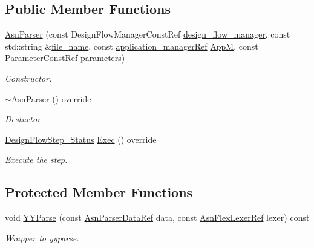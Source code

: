 \subsection*{Public Member Functions}
\begin{DoxyCompactItemize}
\item 
\hyperlink{classAsnParser_a82d6e881bf9cff853a03b9cc83d23532}{Asn\+Parser} (const Design\+Flow\+Manager\+Const\+Ref \hyperlink{classDesignFlowStep_ab770677ddf087613add30024e16a5554}{design\+\_\+flow\+\_\+manager}, const std\+::string \&\hyperlink{classParserFlowStep_a728b0a03e63e3529176b848880d12c72}{file\+\_\+name}, const \hyperlink{application__manager_8hpp_a04ccad4e5ee401e8934306672082c180}{application\+\_\+manager\+Ref} \hyperlink{classAsnParser_a4e0a80b38bb3eca0c3c6641bf6173fff}{AppM}, const \hyperlink{Parameter_8hpp_a37841774a6fcb479b597fdf8955eb4ea}{Parameter\+Const\+Ref} \hyperlink{classDesignFlowStep_a802eaafe8013df706370679d1a436949}{parameters})
\begin{DoxyCompactList}\small\item\em Constructor. \end{DoxyCompactList}\item 
\hyperlink{classAsnParser_a3acc427d2affbbabd19109dce2463464}{$\sim$\+Asn\+Parser} () override
\begin{DoxyCompactList}\small\item\em Destuctor. \end{DoxyCompactList}\item 
\hyperlink{design__flow__step_8hpp_afb1f0d73069c26076b8d31dbc8ebecdf}{Design\+Flow\+Step\+\_\+\+Status} \hyperlink{classAsnParser_abdbeaeae6fefdb8081b3705d0a081d6f}{Exec} () override
\begin{DoxyCompactList}\small\item\em Execute the step. \end{DoxyCompactList}\end{DoxyCompactItemize}
\subsection*{Protected Member Functions}
\begin{DoxyCompactItemize}
\item 
void \hyperlink{classAsnParser_ae5673a36c028dcc21e0c049b860d6b7f}{Y\+Y\+Parse} (const \hyperlink{asn__parser_8hpp_a4415115f21768df96deec09706ef283e}{Asn\+Parser\+Data\+Ref} data, const \hyperlink{asn__lexer_8hpp_a1d453dc3c28f3d6586ede8e92677ea3e}{Asn\+Flex\+Lexer\+Ref} lexer) const
\begin{DoxyCompactList}\small\item\em Wrapper to yyparse. \end{DoxyCompactList}\end{DoxyCompactItemize}
